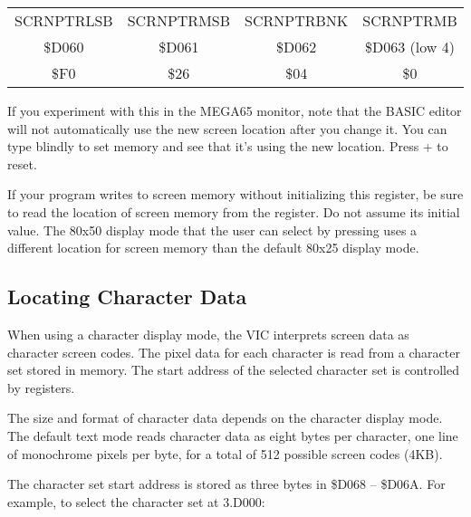 \begin{center}
\begin{tabular}{|c|c|c|c|}
\hline
SCRNPTRLSB & SCRNPTRMSB & SCRNPTRBNK & SCRNPTRMB \\
\$D060 & \$D061 & \$D062 & \$D063 (low 4) \\
\hline
\$F0 & \$26 & \$04 & \$0 \\
\hline
\end{tabular}
\end{center}


If you experiment with this in the MEGA65 monitor, note that the BASIC editor
will not automatically use the new screen location after you change it. You can
type blindly to set memory and see that it's using the new location. Press
 +  to reset.

If your program writes to screen memory without initializing this register, be
sure to read the location of screen memory from the register. Do not assume
its initial value. The 80x50 display mode that the user can select by pressing
  uses a different location for screen memory
than the default 80x25 display mode.

\subsection{Locating Character Data}

When using a character display mode, the VIC interprets screen data as
character screen codes. The pixel data for each character is read from a
character set stored in memory. The start address of the selected character set
is controlled by registers.

The size and format of character data depends
on the character display mode. The default text mode reads character data as
eight bytes per character, one line of monochrome pixels per byte, for a total
of 512 possible screen codes (4KB).

The character set start address is stored as three bytes in \$D068 -- \$D06A.
For example, to select the character set at 3.D000:

